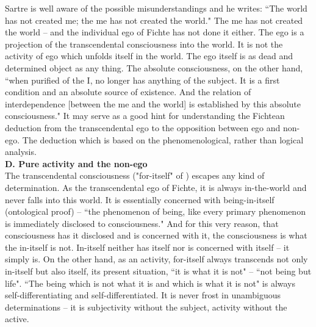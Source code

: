 Sartre is well aware of the possible misunderstandings and he writes: ``The world has not created me; the me has 
not created the world." \cite{ToE} The me has not created the world -- and the individual ego of Fichte has not done it either. 
The ego is a projection of the transcendental consciousness into the world. It is not the activity of ego which 
unfolds itself in the world. The ego itself is as dead and determined object as any thing. The absolute 
consciousness, on the other hand, ``when purified of the I, no longer has anything of the subject. It is a first 
condition and an absolute source of existence. And the relation of interdependence [between the me and the world] 
is established by this absolute consciousness." \cite{ToE} It may serve as a good hint for understanding the Fichtean 
deduction from the transcendental ego to the opposition between ego and non-ego. The deduction which is based on 
the phenomenological, rather than logical analysis. \\[1ex]
{\bf D. Pure activity and the non-ego} \\
The transcendental consciousness ("for-itself" of \cite{BN}) escapes any kind of determination. As the 
transcendental ego of Fichte, it is always in-the-world and never falls into this world. It is essentially concerned 
with being-in-itself (ontological proof) -- ``the phenomenon of being, like every primary phenomenon is 
immediately disclosed to consciousness." \cite{BN}   And for this very reason, that consciousness has it disclosed and is 
concerned with it, the consciousness is what the in-itself is not. In-itself neither has itself nor is concerned with 
itself -- it simply is. On the other hand, as an activity, for-itself always transcends not only in-itself but also itself, its 
present situation, ``it is what it is not" -- ``not being but life". ``The being which is not what it is and which is 
what it is not" is always self-differentiating and self-differentiated. It is never frost in unambiguous determinations 
-- it is subjectivity without the subject, activity without the active. 

